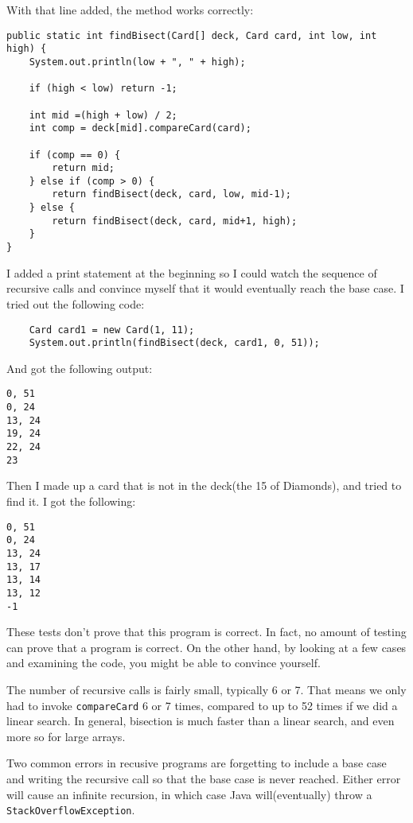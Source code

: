 \documentclass{book}
\begin{document}
With that line added, the method works correctly:

\begin{verbatim}
public static int findBisect(Card[] deck, Card card, int low, int high) {
    System.out.println(low + ", " + high);

    if (high < low) return -1;

    int mid =(high + low) / 2;
    int comp = deck[mid].compareCard(card);

    if (comp == 0) {
        return mid;
    } else if (comp > 0) {
        return findBisect(deck, card, low, mid-1);
    } else {
        return findBisect(deck, card, mid+1, high);
    }
}
\end{verbatim}

I added a print statement at the beginning so I could watch
the sequence of recursive calls and convince myself
that it would eventually reach the base case.  I tried out the
following code:

\begin{verbatim}
    Card card1 = new Card(1, 11);
    System.out.println(findBisect(deck, card1, 0, 51));
\end{verbatim}
%
And got the following output:

\begin{verbatim}
0, 51
0, 24
13, 24
19, 24
22, 24
23
\end{verbatim}
%
Then I made up a card that is not in the deck(the 15 of Diamonds),
and tried to find it.  I got the following:

\begin{verbatim}
0, 51
0, 24
13, 24
13, 17
13, 14
13, 12
-1
\end{verbatim}
%
These tests don't prove that this program is correct.  In fact, no
amount of testing can prove that a program is correct.  On the other
hand, by looking at a few cases and examining the code, you might be
able to convince yourself.


The number of recursive calls is fairly small, typically 6 or 7.
That means we only had to invoke {\tt compareCard} 6 or 7 times,
compared to up to 52 times if we did a linear search.  In general,
bisection is much faster than a linear search, and even more so for
large arrays.

Two common errors in recusive programs are forgetting to include a
base case and writing the recursive call so that the base case is never
reached.  Either error will cause an infinite recursion, in which case
Java will(eventually) throw a {\tt StackOverflowException}.
\end{document}
